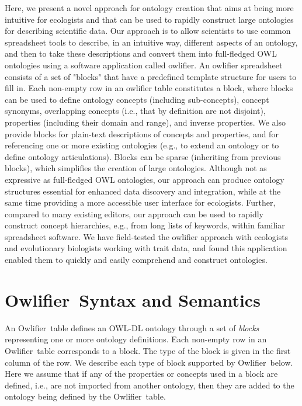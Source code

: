 \documentclass[preprint,number]{elsarticle}
\newcommand{\owlifier}{Owlifier}
\begin{document}
Here, we present a novel approach for ontology creation that aims at
being more intuitive for ecologists and that can be used to rapidly
construct large ontologies for describing scientific data. Our
approach is to allow scientists to use common spreadsheet tools to
describe, in an intuitive way, different aspects of an ontology, and
then to take these descriptions and convert them into full-fledged OWL
ontologies using a software application called owlifier. An owlifier
spreadsheet consists of a set of "blocks" that have a predefined
template structure for users to fill in. Each non-empty row in an
owlifier table constitutes a block, where blocks can be used to define
ontology concepts (including sub-concepts), concept synonyms,
overlapping concepts (i.e., that by definition are not disjoint),
properties (including their domain and range), and inverse
properties. We also provide blocks for plain-text descriptions of
concepts and properties, and for referencing one or more existing
ontologies (e.g., to extend an ontology or to define ontology
articulations). Blocks can be sparse (inheriting from previous
blocks), which simplifies the creation of large ontologies. Although
not as expressive as full-fledged OWL ontologies, our approach can
produce ontology structures essential for enhanced data discovery and
integration, while at the same time providing a more accessible user
interface for ecologists. Further, compared to many existing editors,
our approach can be used to rapidly construct concept hierarchies,
e.g., from long lists of keywords, within familiar spreadsheet
software. We have field-tested the owlifier approach with ecologists
and evolutionary biologists working with trait data, and found this
application enabled them to quickly and easily comprehend and
construct ontologies.



\section{\owlifier\ Syntax and Semantics}

An \owlifier\ table defines an OWL-DL
\cite{smith04:_owl_web_ontol_languag_guide} ontology through a set of
\emph{blocks} representing one or more ontology definitions.  Each
non-empty row in an \owlifier\ table corresponds to a block. The type
of the block is given in the first column of the row. We describe each
type of block supported by \owlifier\ below. Here we assume that if
any of the properties or concepts used in a block are defined, i.e.,
are not imported from another ontology, then they are added to the
ontology being defined by the \owlifier\ table.
\end{document}
